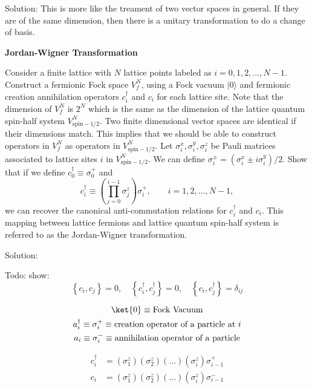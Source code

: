 \begin{homeworkProblem}
\begin{enumerate}[a.]
\begin{callout}{Solution:}
        This is more like the treament of two vector spaces in general. If they are of the same dimension, then there is a unitary transformation to do a change of basis.

        \end{callout}
\end{enumerate}
\end{homeworkProblem}

\begin{homeworkProblem}
\textbf{Jordan-Wigner Transformation}

Consider a finite lattice with $N$ lattice points labeled as $i = 0, 1, 2, \ldots, N-1$. Construct a fermionic Fock space $V^{N}_{f}$, using a Fock vacuum $|0\rangle$ and fermionic creation annihilation operators $c_i^{\dagger}$ and $c_i$ for each lattice site. Note that the dimension of $V^{N}_{f}$ is $2^N$ which is the same as the dimension of the lattice quantum spin-half system $V^{N}_{\mathrm{spin-1/2}}$. Two finite dimensional vector spaces are identical if their dimensions match. This implies that we should be able to construct operators in $V^{N}_{f}$ as operators in $V^{N}_{\mathrm{spin-1/2}}$. Let $\sigma_i^x, \sigma_i^y, \sigma_i^z$ be Pauli matrices associated to lattice sites $i$ in $V^{N}_{\mathrm{spin-1/2}}$. We can define $\sigma_i^{\pm} = (\sigma_i^x \pm i \sigma_i^y)/2$. Show that if we define $c_0^{\dagger} \equiv \sigma_0^{+}$ and
\[
c_i^{\dagger} \equiv \left( \prod_{j=0}^{i-1} \sigma_j^z \right) \sigma_i^{+}, \qquad i = 1, 2, \ldots, N-1,
\]
we can recover the canonical anti-commutation relations for $c_i^{\dagger}$ and $c_i$. This mapping between lattice fermions and lattice quantum spin-half system is referred to as the Jordan-Wigner transformation.
\begin{callout}{Solution:}

Todo: show:
$$ \left\{c_i, c_j\right\}=0, \quad\left\{c_i^{\dagger}, c_j^{\dagger}\right\}=0, \quad\left\{c_i, c_j^{\dagger}\right\}=\delta_{i j} $$

\begin{gather*}
    \ket{0} \equiv \text{Fock Vacuum} \\
    a^{\dagger}_{i} \equiv \sigma_{i}^+ \equiv \text{creation operator of a particle at $i$} \\
    a_{i} \equiv \sigma_{i}^- \equiv \text{annihilation operator of a particle}
\end{gather*}

\begin{align*}
    c_i^{\dagger} &= (\sigma_1^{z})(\sigma_2^{z})(\dots)(\sigma_i^{z})\sigma_{i-1}^{+} \\
    c_i &= (\sigma_1^{z})(\sigma_2^{z})(\dots)(\sigma_i^{z})\sigma_{i-1}^{-}
\end{align*}


\end{callout}
\end{homeworkProblem}
